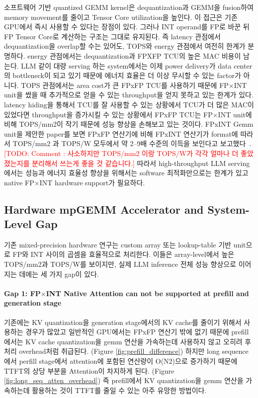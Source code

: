 \documentclass[11pt]{article}
\newcommand{\todo}[1]{\textcolor{red}{[TODO: #1]}}
\newcommand{\fpint}{FP$\times$INT}
\begin{document}
소프트웨어 기반 quantized GEMM kernel은 dequantization과 GEMM을 fusion하여 memory movement를 줄이고 Tensor Core utilization을 높인다.
이 접근은 기존 GPU에서 즉시 사용할 수 있다는 장점이 있다.
그러나 INT operand를 FP로 바꾼 뒤 FP Tensor Core로 계산하는 구조는 그대로 유지된다.
즉 latency 관점에서 dequantization을 overlap할 수는 있어도, TOPS와 energy 관점에서 여전히 한계가 분명하다.
energy 관점에서는 dequantization과 FPXFP TCU의 높은 MAC 비용이 남는다.
LLM 같이 대량 serving 하는 system에서는 이제 power delivery가 data center의 bottleneck이 되고 있기 때문에 에너지 효율은 더 이상 무시할 수 있는 factor가 아니다.
TOPS 관점에서는 area cost가 큰 FPxFP TCU를 사용하기 때문에 \fpint{} unit을 썼을 때 추가적으로 얻을 수 있는 throughput을 얻지 못하고 있는 한계가 있다.
latency hiding을 통해서 TCU를 잘 사용할 수 있는 상황에서 TCU가 더 많은 MAC이 있었다면 throughput을 증가시킬 수 있는 상황에서 FPxFP TCU는 \fpint{} unit에 비해 TOPS/mm2이 작기 때문에 성능 향상을 손해보고 있는 것이다. 
FPxINT Gemm unit을 제안한 paper를 보면 FPxFP 연산기에 비해 FPxINT 연산기가 format에 따라서 TOPS/mm2 과 TOPS/W 모두에서 약 2--9배 수준의 이득을 보인다고 보고했다~\cite{figna}. \todo{Comment : 사소하지만 TOPS/mm2 이랑 TOPS/W가 각각 얼마나 더 좋았졌는지를 분리해서 쓰는게 좋을 것 같습니다.}
따라서 high-throughput LLM serving에서는 성능과 에너지 효율성 향상을 위해서는 software 최적화만으로는 한계가 있고 native \fpint{} hardware support가 필요하다.

\subsection{Hardware mpGEMM Accelerator and System-Level Gap}
\label{sec:sys_gap}

기존 mixed-precision hardware 연구는 custom array 또는 lookup-table 기반 unit으로 FP와 INT 사이의 곱셈을 효율적으로 처리한다. 
이들은 array-level에서 높은 TOPS/mm2과 TOPS/W를 보이지만, 실제 LLM inference 전체 성능 향상으로 이어지는 데에는 세 가지 gap이 있다.

\paragraph{Gap 1: \fpint{} Native Attention can not be supported at prefill and generation stage}
기존에는 KV quantization을 generation stage에서의 KV cache를 줄이기 위해서 사용하는 경우가 많았고 일반적인 GPU에서는 FPxFP 연산기 밖에 없기 때문에 prefill에서는 KV cache quantization을 gemm 연산을 가속하는데 사용하지 않고 오히려 후처리 overhead처럼 취급된다. (Figure \ref{fig:prefill_difference}) 하지만 long sequence에서 perfill stage에서 attention에 포함된 연산량이 O(N2)으로 증가하기 때문에 TTFT의 상당 부분을 Attention이 차지하게 된다. (Figure \ref{fig:long_seq_atten_overhead})
즉 prefill에서 KV quantization을 gemm 연산을 가속하는데 활용하는 것이 TTFT를 줄일 수 있는 아주 유망한 방법이다.
\end{document}
